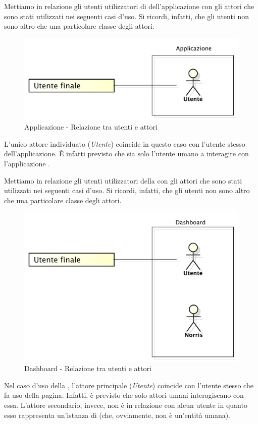 	Mettiamo in relazione gli utenti utilizzatori di dell'applicazione  con gli attori che sono stati utilizzati nei seguenti casi d'uso. Si ricordi, infatti, che gli utenti non sono altro che una particolare classe degli attori.
	\begin{figure}[H]
		\centering
		\includegraphics[scale=0.4]{Pics/UtentiAttoriApplicazione}
		\caption{Applicazione - Relazione tra utenti e attori}
	\end{figure}
	L'unico attore individuato (\emph{Utente}) coincide in questo caso con l'utente stesso dell'applicazione. È infatti previsto che sia solo l'utente umano a interagire con l'applicazione .
	

	Mettiamo in relazione gli utenti utilizzatori della  con gli attori che sono stati utilizzati nei seguenti casi d'uso. Si ricordi, infatti, che gli utenti non sono altro che una particolare classe degli attori.
	\begin{figure}[H]
		\centering
		\includegraphics[scale=0.4]{Pics/UtentiAttoriDashboard}
		\caption{Dashboard - Relazione tra utenti e attori}
	\end{figure}
	Nel caso d'uso della , l'attore principale (\emph{Utente}) coincide con l'utente stesso che fa uso della pagina. Infatti, è previsto che solo attori umani interagiscano con essa. L'attore secondario, invece, non è in relazione con alcun utente in quanto esso rappresenta un'istanza di  (che, ovviamente, non è un'entità umana).
	
